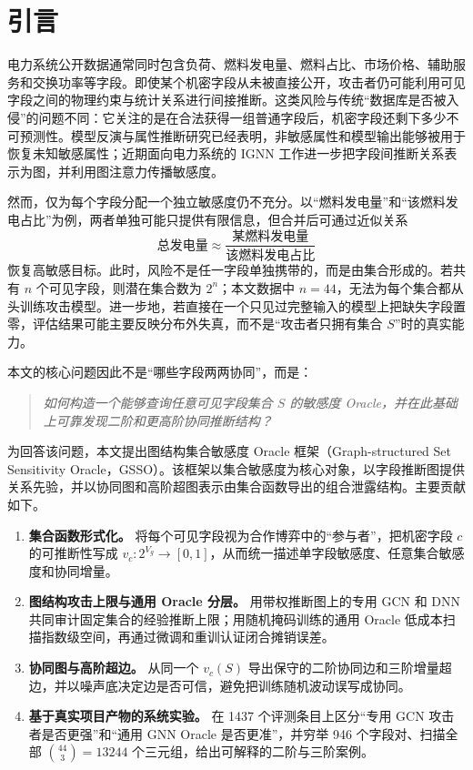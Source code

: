 \documentclass[UTF8,a4paper,zihao=5,fontset=fandol]{ctexart}
\newcommand{\method}{GSSO}
\begin{document}

\pagestyle{fancy}

\section{引言}

电力系统公开数据通常同时包含负荷、燃料发电量、燃料占比、市场价格、辅助服务和交换功率等字段。即使某个机密字段从未被直接公开，攻击者仍可能利用可见字段之间的物理约束与统计关系进行间接推断。这类风险与传统“数据库是否被入侵”的问题不同：它关注的是在合法获得一组普通字段后，机密字段还剩下多少不可预测性。模型反演与属性推断研究已经表明，非敏感属性和模型输出能够被用于恢复未知敏感属性\citep{fredrikson2015model,mehnaz2022sensitive}；近期面向电力系统的 IGNN 工作进一步把字段间推断关系表示为图，并利用图注意力传播敏感度\citep{hu2026ignn}。

然而，仅为每个字段分配一个独立敏感度仍不充分。以“燃料发电量”和“该燃料发电占比”为例，两者单独可能只提供有限信息，但合并后可通过近似关系
\begin{equation}
  \text{总发电量}\approx
  \frac{\text{某燃料发电量}}{\text{该燃料发电占比}}
\end{equation}
恢复高敏感目标。此时，风险不是任一字段单独携带的，而是由集合形成的。若共有 $n$ 个可见字段，则潜在集合数为 $2^n$；本文数据中 $n=44$，无法为每个集合都从头训练攻击模型。进一步地，若直接在一个只见过完整输入的模型上把缺失字段置零，评估结果可能主要反映分布外失真，而不是“攻击者只拥有集合 $S$”时的真实能力。

本文的核心问题因此不是“哪些字段两两协同”，而是：
\begin{quote}
\centering
\emph{如何构造一个能够查询任意可见字段集合 $S$ 的敏感度 Oracle，并在此基础上可靠发现二阶和更高阶协同推断结构？}
\end{quote}

为回答该问题，本文提出图结构集合敏感度 Oracle 框架（Graph-structured Set Sensitivity Oracle，\method）。该框架以集合敏感度为核心对象，以字段推断图提供关系先验，并以协同图和高阶超图表示由集合函数导出的组合泄露结构。主要贡献如下。

\begin{enumerate}
  \item \textbf{集合函数形式化。} 将每个可见字段视为合作博弈中的“参与者”，把机密字段 $c$ 的可推断性写成 $v_c:2^{V_g}\rightarrow[0,1]$，从而统一描述单字段敏感度、任意集合敏感度和协同增量。
  \item \textbf{图结构攻击上限与通用 Oracle 分层。} 用带权推断图上的专用 GCN 和 DNN 共同审计固定集合的经验推断上限；用随机掩码训练的通用 Oracle 低成本扫描指数级空间，再通过微调和重训认证闭合摊销误差。
  \item \textbf{协同图与高阶超边。} 从同一个 $v_c(S)$ 导出保守的二阶协同边和三阶增量超边，并以噪声底决定边是否可信，避免把训练随机波动误写成协同。
  \item \textbf{基于真实项目产物的系统实验。} 在 1437 个评测条目上区分“专用 GCN 攻击者是否更强”和“通用 GNN Oracle 是否更准”，并穷举 946 个字段对、扫描全部 $\binom{44}{3}=13244$ 个三元组，给出可解释的二阶与三阶案例。
\end{enumerate}
\end{document}

